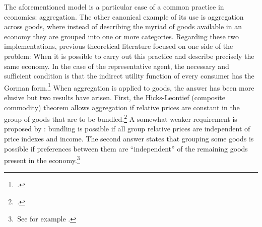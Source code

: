 \documentclass[english, a4paper, 12pt]{article}
\begin{document}
The aforementioned model is a particular case of a common practice in economics: aggregation. The other canonical example of its use is aggregation across goods, where instead of describing the myriad of goods available in an economy they are grouped into one or more categories. Regarding these two implementations, previous theoretical literature focused on one side of the problem: When it is possible to carry out this practice and describe precisely the same economy. In the case of the representative agent, the necessary and sufficient condition is that the indirect utility function of every consumer has the Gorman form.\footnote{\,\cite{Gorman53}.} When aggregation is applied to goods, the answer has been more elusive but two results have arisen. First, the Hicks-Leontief (composite commodity) theorem allows aggregation if relative prices are constant in the group of goods that are to be bundled.\footnote{\,\cite{Leontief36, HicksBook}.} A somewhat weaker requirement is proposed by \cite{Lewbel96}: bundling is possible if all group relative prices are independent of price indexes and income. The second answer states that grouping some goods is possible if preferences between them are ``independent'' of the remaining goods present in the economy.\footnote{\,See for example \cite{GormanSeparability}.} 
\end{document}
